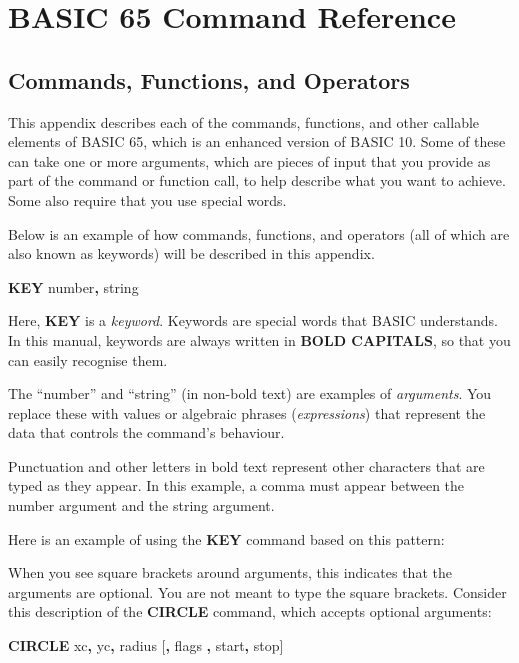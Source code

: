 \hypersetup{bookmarksdepth=2}
\chapter{BASIC 65 Command Reference}
\label{cha:basic-reference}


\section{Commands, Functions, and Operators}

This appendix describes each of the commands, functions, and other callable elements of BASIC 65, which is an enhanced version of BASIC 10. Some of these can take one or more arguments, which are pieces of input that you provide as part of the command or function call, to help describe what you want to achieve. Some also require that you use special words.

Below is an example of how commands, functions, and operators (all of which are also known as keywords) will be described in this appendix.

{\bf KEY} number{\bf,} string

Here, {\bf KEY} is a {\em keyword}. Keywords are special words that BASIC understands. In this manual, keywords are always written in {\bf BOLD CAPITALS}, so that you can easily recognise them.

The ``number'' and ``string'' (in non-bold text) are examples of {\em arguments}. You replace these with values or algebraic phrases ({\em expressions}) that represent the data that controls the command's behaviour.

Punctuation and other letters in bold text represent other characters that are typed as they appear. In this example, a comma must appear between the number argument and the string argument.

Here is an example of using the {\bf KEY} command based on this pattern:


When you see square brackets around arguments, this indicates that the arguments are optional. You are not meant to type the square brackets. Consider this description of the {\bf CIRCLE} command, which accepts optional arguments:

{\bf CIRCLE} xc{\bf,} yc{\bf,} radius [{\bf,} flags {\bf,} start{\bf,} stop]

